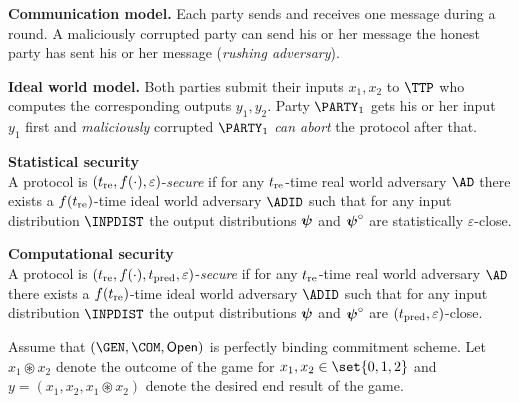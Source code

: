 \documentclass[landscape,footrule]{foils}
\newcommand{\lastline}{\vspace*{-2ex}}
\begin{document}
\textbf{Communication model.}  Each party sends and receives one
message during a round. A maliciously corrupted party can send his or
her message the honest party has sent his or her message
(\emph{rushing adversary}).
\bigskip


\textbf{Ideal world model.} Both parties submit their inputs $x_1,x_2$
to $\TTP$ who computes the corresponding outputs $y_1,y_2$. Party
$\PARTY_1$ gets his or her input $y_1$ first and \emph{maliciously}
corrupted $\PARTY_1$ \emph{can abort} the protocol after that.
\lastline




\textbf{Statistical security}\vspace*{0.5ex}\\
A protocol is $(t_{\mathrm{re}},f(\cdot),\varepsilon)$-\emph{secure} if for any
$t_{\mathrm{re}}$-time real world adversary $\AD$ there exists a $f(t_{\mathrm{re}})$-time
ideal world adversary $\ADID$ such that for any input distribution
$\INPDIST$ the output distributions $\boldsymbol{\psi}$ and
$\boldsymbol{\psi}^\circ$ are statistically $\varepsilon$-close.
\Bigskip

\textbf{Computational security}\vspace*{0.5ex}\\
A protocol is $(t_{\mathrm{re}},f(\cdot),t_{\mathrm{pred}},\varepsilon)$-\emph{secure} if for
any $t_{\mathrm{re}}$-time real world adversary $\AD$ there exists a $f(t_{\mathrm{re}})$-time
ideal world adversary $\ADID$ such that for any input distribution
$\INPDIST$ the output distributions $\boldsymbol{\psi}$ and
$\boldsymbol{\psi}^\circ$ are  $(t_{\mathrm{pred}},\varepsilon)$-close.




\enlargethispage{1cm}




Assume that $(\GEN,\COM,\OPEN)$ is perfectly binding commitment scheme.
Let $x_1\circledast x_2$ denote the outcome of the game for
$x_1,x_2\in\set{0,1,2}$ and $y=(x_1,x_2,x_1\circledast x_2)$
denote the desired end result of the game.
\end{document}
